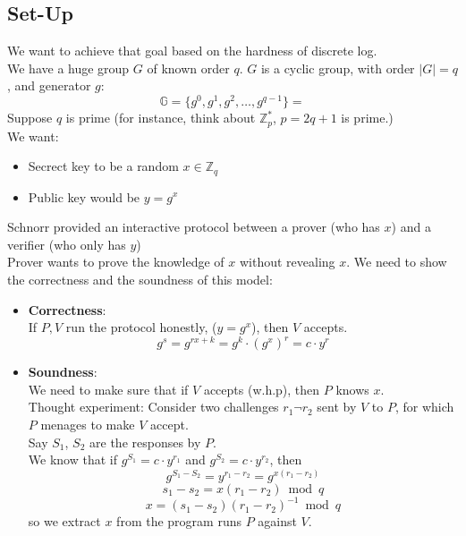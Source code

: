 \documentclass{scribe}
\begin{document}
\subsection{Set-Up}
We want to achieve that goal based on the hardness of discrete log.
\\
We have a huge group $G$ of known order $q$. $G$ is a cyclic group, with order $|G| = q$, and generator $g$:
\[\mathbb{G} = \{g^0,g^1,g^2, \dots, g^{q-1}\} = \]
Suppose $q$ is prime (for instance, think about $\mathbb{Z}_p^*$, $p =2q+1$ is prime.)
\\
We want:
\begin{itemize}
    \item Secrect key to be a random $x \in \mathbb{Z}_q$
    \item Public key would be $ y = g^x$
\end{itemize}
Schnorr provided an interactive protocol between a prover (who has $x$) and a verifier (who only has $y$)
\\
Prover wants to prove the knowledge of $x$ without revealing $x$.
We need to show the correctness and the soundness of this model:
\begin{itemize}
    \item \textbf{Correctness}:\\
            If $P,V$ run the protocol honestly, ($y = g^x$), then $V$ accepts.
            \[g^s = g^{rx+k} = g^k \cdot (g^x)^r = c \cdot y^r\]
    \item \textbf{Soundness}:\\
            We need to make sure that if $V$ accepts (w.h.p), then $P$ knows $x$.\\
            Thought experiment: Consider two challenges $r_1 \neg r_2$ sent by $V$ to $P$, for which $P$ menages to make $V$ accept.\\
            Say $S_1$, $S_2$ are the responses by $P$.\\
            We know that if $g^{S_1} = c \cdot y^{r_1}$ and $g^{S_2} = c \cdot y^{r_2}$, then
            \[g^{S_1 - S_2} = y^{r_1-r_2} = g^{x(r_1-r_2)}\]
            \[ s_1-s_2 = x(r_1-r_2) \bmod q\]
            \[x = (s_1 - s_2)(r_1-r_2)^{-1} \bmod q\]
            so we extract $x$ from the program runs $P$ against $V$.
\end{itemize}


\vspace{10mm}
\end{document}

